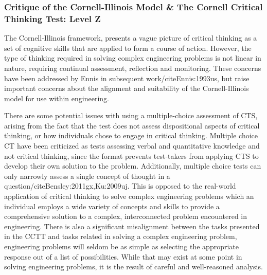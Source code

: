 \subsubsection{Critique of the Cornell-Illinois Model & The Cornell Critical Thinking Test: Level Z}

The Cornell-Illinois framework, presents a vague picture of critical thinking as a set of cognitive skills that are applied to form a course of action.  However, the type of thinking required in solving complex engineering problems is not linear in nature, requiring continual assessment, reflection and monitoring.  These concerns have been addressed by Ennis in subsequent work/cite{Ennis:1993us}, but raise important concerns about the alignment and suitability of the Cornell-Illinois model for use within engineering.  

There are some potential issues with using a multiple-choice assessment of CTS, arising from the fact that the test does not assess dispositional aspects of critical thinking, or how individuals chose to engage in critical thinking.  Multiple choice CT have been criticized as tests assessing verbal and quantitative knowledge and not critical thinking, since the format prevents test-takers from applying CTS to develop their own solution to the problem\cite{Abrami:2008td, Ku:2009uj}. Additionally, multiple choice tests can only narrowly assess a single concept of thought in a question/cite{Bensley:2011gx,Ku:2009uj}. This is opposed to the real-world application of critical thinking to solve complex engineering problems which an individual employs a wide variety of concepts and skills to provide a comprehensive solution to a complex, interconnected problem encountered in engineering.  There is also a significant misalignment between the tasks presented in the CCTT and tasks related in solving a complex engineering problem, engineering problems will seldom be as simple as selecting the appropriate response out of a list of possibilities.  While that may exist at some point in solving engineering problems, it is the result of careful and well-reasoned analysis.